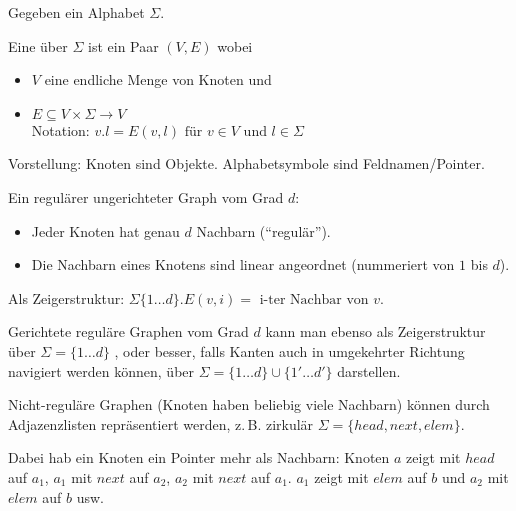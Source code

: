 \begin{definition}

    Gegeben ein Alphabet $\Sigma$.

    Eine  über $\Sigma$ ist ein Paar $(V, E)$ wobei
    \begin{itemize}
        \item $V$ eine endliche Menge von Knoten und
        \item $E \subseteq V \times \Sigma \rightarrow V$
                \\
                Notation: $v.l = E(v,l) \text{ für } v \in V \text{ und } l \in \Sigma$
    \end{itemize}

    Vorstellung: Knoten sind Objekte. Alphabetsymbole sind Feldnamen/Pointer.


\end{definition}

\begin{beispiel}

    Ein regulärer ungerichteter Graph vom Grad $d$:
    \begin{itemize}
        \item Jeder Knoten hat genau $d$ Nachbarn (``regulär'').
        \item Die Nachbarn eines Knotens sind linear angeordnet (nummeriert von $1$ bis $d$).
    \end{itemize}


    Als Zeigerstruktur: $\Sigma \{ 1 \dots d \} . E(v,i) = \text{ i-ter Nachbar von } v$.

\end{beispiel}

\begin{beispiel}

    Gerichtete reguläre Graphen vom Grad $d$ kann man ebenso als Zeigerstruktur über $\Sigma = \{ 1 \dots d \}$ , oder besser, falls Kanten auch in umgekehrter Richtung navigiert werden können, über $\Sigma = \{ 1 \dots d \} \cup \{ 1' \dots d' \} $ darstellen.

\end{beispiel}

\begin{beispiel}

    Nicht-reguläre Graphen (Knoten haben beliebig viele Nachbarn) können durch Adjazenzlisten repräsentiert werden, z.\,B. zirkulär $\Sigma = \{ head, next, elem \}$.

    Dabei hab ein Knoten ein Pointer mehr als Nachbarn: Knoten $a$ zeigt mit $head$ auf $a_1$, $a_1$ mit $next$ auf $a_2$, $a_2$ mit $next$ auf $a_1$. $a_1$ zeigt mit $elem$ auf $b$ und $a_2$ mit $elem$ auf $b$ usw.

\end{beispiel}


